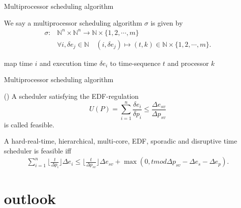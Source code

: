 \documentclass{beamer}
\begin{document}
	
	\begin{frame}{Multiprocessor scheduling algorithm}	
	\begin{definition}
We say a multiprocessor scheduling algorithm $\sigma$ is given by 
	\begin{align} 
	\sigma: &\mathbb{N}^n \times \mathbb{N}^n \longrightarrow  \mathbb{N} \times \{1,2,\cdots, m\} \\
	&\forall i, \delta e_j \in  \mathbb{N} \quad (i ,\delta e_j)  \mapsto (t,k) \in \mathbb{N}\times \{1,2,\cdots,m\}. 
	\end{align}
\end{definition}
  map time $i$ and execution time $\delta e_i$ to time-sequence $t$ and processor $k$ 		
 	\end{frame}
 	
 	
 	\begin{frame}{Multiprocessor scheduling algorithm}
 	
\begin{definition}()
 A scheduler satisfying the EDF-regulation 
	\begin{equation}
	U(P) = \sum\limits_{i=1}^n \frac{\delta e_i}{\delta p_i} \leq 		\frac{\Delta e_{sv}}{\Delta p_{sv}}
	\end{equation}
	is called feasible.
\end{definition}	


 	\begin{theorem}
		A hard-real-time, hierarchical, multi-core, EDF, sporadic and disruptive time scheduler is feasible iff 
			\begin{align}
	\sum_{i=1}^n \lfloor \frac{t}{\Delta p_i} \rfloor \Delta e_i \leq \lfloor  \frac{t}{\Delta p_{sv}} \rfloor \Delta e_{sv} + \max (0,t  mod \Delta p_{sv} -\Delta e_{s} -\Delta e_p).
			\end{align}
		\end{theorem}
 \end{frame}
 	
 	

 	

	\section{outlook}
	
\end{document}
